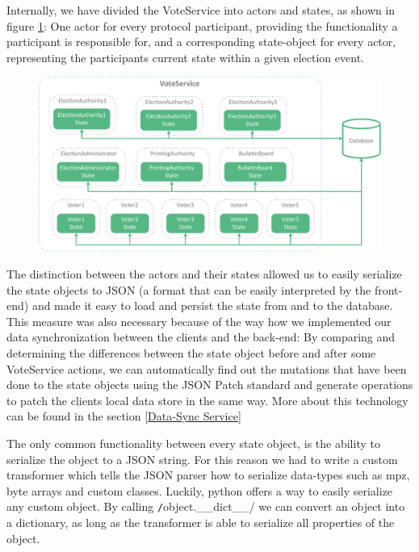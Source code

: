 Internally, we have divided the VoteService into actors and states, as shown in figure \ref{VoteService}: One actor for every protocol participant, providing the functionality a participant is responsible for, and a corresponding state-object for every actor, representing the participants current state within a given election event.

\begin{figure}[p]
\begin{center}
\includegraphics[scale=0.68]{assets/voteservice.pdf}
\label{VoteService}%
\end{center}
\end{figure}

The distinction between the actors and their states allowed us to easily serialize the state objects to JSON (a format that can be easily interpreted by the front-end) and made it easy to load and persist the state from and to the database. This measure was also necessary because of the way how we implemented our data synchronization between the clients and the back-end: By comparing and determining the differences between the state object before and after some VoteService actions, we can automatically find out the mutations that have been done to the state objects using the JSON Patch standard and generate operations to patch the clients local data store in the same way. More about this technology can be found in the section \ref{Data-Sync Service}

The only common functionality between every state object, is the ability to serialize the object to a JSON string. For this reason we had to write a custom transformer which tells the JSON parser how to serialize data-types such as mpz, byte arrays and custom classes. Luckily, python offers a way to easily serialize any custom object. By calling \texttt/object.__dict__/ we can convert an object into a dictionary, as long as the transformer is able to serialize all properties of the object.

